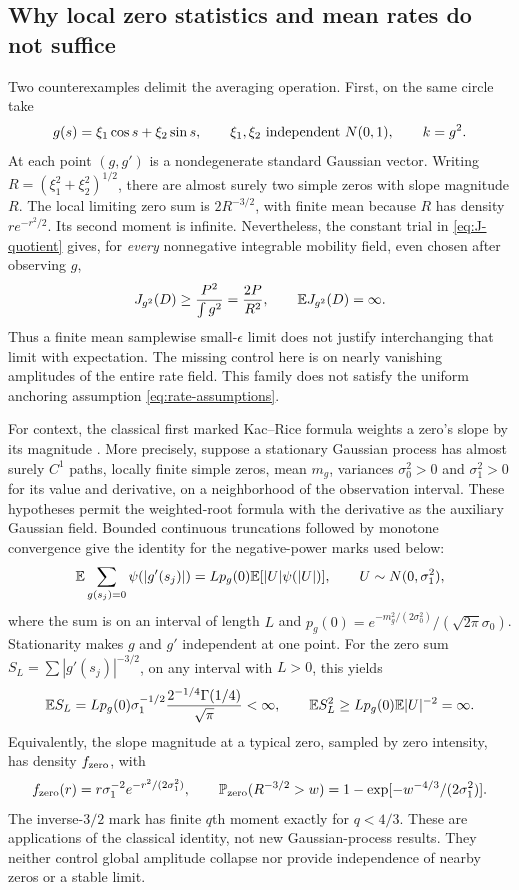 \subsection{Why local zero statistics and mean rates do not suffice}
Two counterexamples delimit the averaging operation. First, on the same
circle take
\begin{equation}\label{eq:gaussian-collapse}
 g(s)=\xi_1\cos s+\xi_2\sin s,\qquad
 \xi_1,\xi_2\ \hbox{independent }N(0,1),\qquad k=g^2.
\end{equation}
At each point $(g,g')$ is a nondegenerate standard Gaussian vector.
Writing $R=(\xi_1^2+\xi_2^2)^{1/2}$, there are almost surely two
simple zeros with slope magnitude $R$. The local limiting zero sum
is $2R^{-3/2}$, with finite mean because $R$ has density
$r e^{-r^2/2}$. Its second moment is infinite. Nevertheless, the
constant trial in \eqref{eq:J-quotient} gives, for \emph{every}
nonnegative integrable mobility field, even chosen after observing $g$,
\begin{equation}\label{eq:gaussian-response-lower}
 J_{g^2}(D)\ge\frac{P^2}{\int g^2}=\frac{2P}{R^2},
 \qquad \mathbb E J_{g^2}(D)=\infty.
\end{equation}
Thus a finite mean samplewise small-$\epsilon$ limit does not justify
interchanging that limit with expectation. The missing control here
is on nearly vanishing amplitudes of the entire rate field. This
family does not satisfy the uniform anchoring assumption
\eqref{eq:rate-assumptions}.

For context, the classical first marked Kac--Rice formula weights a
zero's slope by its magnitude \citep[Theorems~6.2 and~6.4]{AzaisWschebor2009}.
More precisely, suppose a
stationary Gaussian process has almost surely $C^1$ paths, locally
finite simple zeros, mean $m_g$, variances $\sigma_0^2>0$ and
$\sigma_1^2>0$ for its value and derivative, on a neighborhood of the
observation interval. These hypotheses permit
the weighted-root formula with the derivative as the auxiliary Gaussian
field. Bounded continuous truncations followed by monotone convergence
give the identity for the negative-power marks used below:
\begin{equation}\label{eq:marked-rice}
 \mathbb E\sum_{g(s_j)=0}\psi(|g'(s_j)|)
  =L p_g(0)\mathbb E[|U|\psi(|U|)],\qquad U\sim N(0,\sigma_1^2),
\end{equation}
where the sum is on an interval of length $L$ and
$p_g(0)=e^{-m_g^2/(2\sigma_0^2)}/(\sqrt{2\pi}\sigma_0)$.
Stationarity makes $g$ and $g'$ independent at one point.
For the zero sum $S_L=\sum|g'(s_j)|^{-3/2}$, on any interval with $L>0$, this yields
\[
 \mathbb E S_L=L p_g(0)\sigma_1^{-1/2}
                 \frac{2^{-1/4}\Gamma(1/4)}{\sqrt\pi}<\infty,
 \qquad
 \mathbb E S_L^2\ge Lp_g(0)\mathbb E|U|^{-2}=\infty.
\]
Equivalently, the slope magnitude at a typical zero, sampled by zero
intensity, has density $f_{\rm zero}$, with
\[
 f_{\rm zero}(r)=r\sigma_1^{-2}e^{-r^2/(2\sigma_1^2)},\qquad
 \mathbb P_{\rm zero}(R^{-3/2}>w)
       =1-\exp[-w^{-4/3}/(2\sigma_1^2)].
\]
The inverse-$3/2$ mark has finite $q$th moment exactly for $q<4/3$. These are applications of the classical identity, not
new Gaussian-process results. They neither control global amplitude
collapse nor provide independence of nearby zeros or a stable limit.

